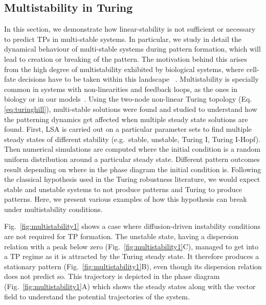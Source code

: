 \subsection{Multistability in Turing}
In this section, we demonstrate how linear-stability is not sufficient or necessary to predict TPs in multi-stable systems.
In particular, we study in detail the dynamical behaviour of multi-stable systems during pattern formation, which will lead to creation or breaking of the pattern.
The motivation behind this arises from the high degree of multistability exhibited by biological systems, where cell-fate decisions have to be taken within this landscape ~\parencite{huang2000shape, moris2016transition}.
Multistability is specially common in systems with non-linearities and feedback loops, as the ones in biology or in our models~\parencite{pham2020complexity, leite2009multistability}.
Using the two-node non-linear Turing topology (Eq. \ref{eq:turinghill}), multi-stable solutions were found and studied to understand how the patterning dynamics get affected when multiple steady state solutions are found.
First, LSA is carried out on a particular parameter sets to find multiple steady states of different stability (e.g.~stable, unstable, Turing I, Turing I-Hopf).
Then numerical simulations are computed where the initial condition is a random uniform distribution around a particular steady state.
Different pattern outcomes result depending on where in the phase diagram the initial condition is.
Following the classical hypothesis used in the Turing robustness literature, we would expect stable and unstable systems to not produce patterns and Turing to produce patterns.
Here, we present various examples of how this hypothesis can break under multistability conditions.

Fig.~\ref{fig:multistability1} shows a case where diffusion-driven instability conditions are not required for TP formation.
The unstable state, having a dispersion relation with a peak below zero (Fig.~\ref{fig:multistability1}C), managed to get into a TP regime as it is attracted by the Turing steady state.
It therefore produces a stationary pattern (Fig.~\ref{fig:multistability1}B), even though its dispersion relation does not predict so.
This trajectory is depicted in the phase diagram (Fig.~\ref{fig:multistability1}A) which shows the steady states along with the vector field to understand the potential trajectories of the system.

